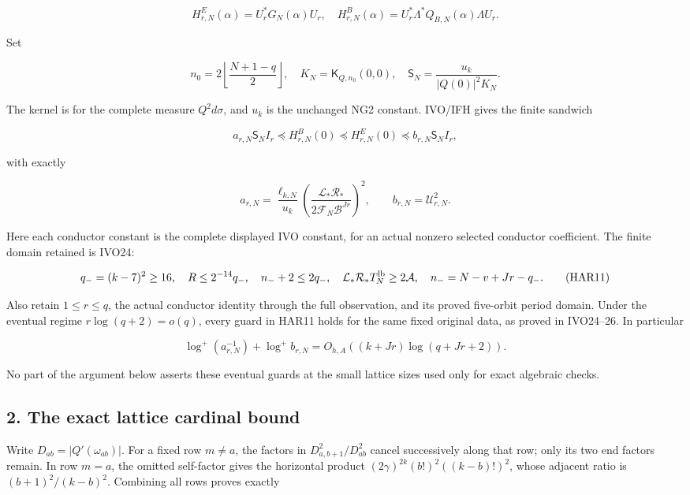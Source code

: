 \documentclass[11pt]{article}
\begin{document}
\[
H^E_{r,N}(\alpha)=U_r^*G_N(\alpha)U_r,
\quad H^B_{r,N}(\alpha)=U_r^*\Lambda^*Q_{B,N}(\alpha)\Lambda U_r.
\tag{HAR7}
\]

Set

\[
n_0=2\left\lfloor\frac{N+1-q}{2}\right\rfloor,
\quad K_N=\mathsf K_{Q,n_0}(0,0),
\quad \mathsf S_N=\frac{u_k}{|Q(0)|^2K_N}.
\tag{HAR8}
\]

The kernel is for the complete measure \(Q^2d\sigma\), and \(u_k\) is the unchanged NG2 constant. IVO/IFH gives the finite sandwich

\[
a_{r,N}\mathsf S_N I_r\preceq H^B_{r,N}(0)
\preceq H^E_{r,N}(0)\preceq b_{r,N}\mathsf S_N I_r,
\tag{HAR9}
\]

with exactly

\[
a_{r,N}=\frac{\ell_{k,N}}{u_k}
\left(\frac{\mathcal L_*\mathcal R_*}{2\mathcal F_N\mathcal B^{Jr}}\right)^2,
\qquad b_{r,N}=\mathcal U_{r,N}^2.
\tag{HAR10}
\]

Here each conductor constant is the complete displayed IVO constant, for an actual nonzero selected conductor coefficient. The finite domain retained is IVO24:

\[
q_-=(k-7)^2\ge16,\quad R\le2^{-14}q_-,\quad
n_-+2\le2q_-,\quad
\mathcal L_*\mathcal R_*T_N^{\rm lb}\ge2\mathcal A,
\quad n_-=N-v+Jr-q_-.
\tag{HAR11}
\]

Also retain \(1\le r\le q\), the actual conductor identity through the full observation, and its proved five-orbit period domain. Under the eventual regime \(r\log(q+2)=o(q)\), every guard in HAR11 holds for the same fixed original data, as proved in IVO24--26. In particular

\[
\log^+(a_{r,N}^{-1})+\log^+b_{r,N}
=O_{h,A}((k+Jr)\log(q+Jr+2)).
\tag{HAR12}
\]

No part of the argument below asserts these eventual guards at the small lattice sizes used only for exact algebraic checks.

\subsection{2. The exact lattice cardinal bound}\label{the-exact-lattice-cardinal-bound}

Write \(D_{ab}=|Q'(\omega_{ab})|\). For a fixed row \(m\ne a\), the factors in \(D_{a,b+1}^2/D_{ab}^2\) cancel successively along that row; only its two end factors remain. In row \(m=a\), the omitted self-factor gives the horizontal product \((2\gamma)^{2k}(b!)^2((k-b)!)^2\), whose adjacent ratio is \((b+1)^2/(k-b)^2\). Combining all rows proves exactly
\end{document}

